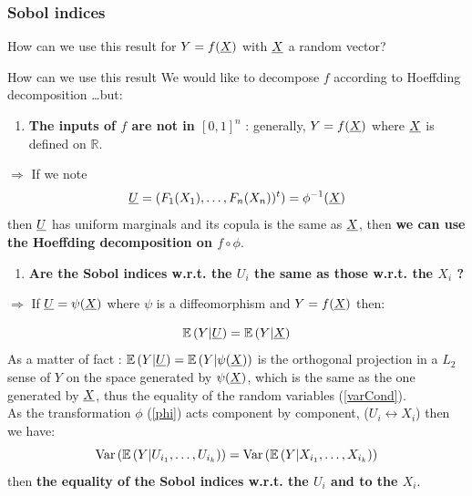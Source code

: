 \documentclass[8pt]{beamer}
\begin{document}
\begin{frame}
\frametitle{Sobol indices}
\small
How can we use this result for $Y = f({\underline{X}})$ with ${\underline{X}}$ a random vector?

\begin{block}{How can we use this result}
    \small
      We would like to decompose $f$ according to Hoeffding decomposition \dots but: \\
      \begin{enumerate}
      \item  \alert{\bf The inputs of $f$ are not in $[0,1]^n$} :  generally, $Y=f({\underline{X}})$ where  ${\underline{X}}$ is defined on $\mathbb{R}$.
      \end{enumerate}
      \alert{$\Longrightarrow$} If we note
       \begin{equation}
         \label{phi}
         {\underline{U}} = (F_1(X_1), \dots, F_n(X_n))^t) = \phi^{-1}({\underline{X}})
       \end{equation}
       then ${\underline{U}}$ has uniform marginals and its copula is the same as ${\underline{X}}$, then {\bf we can use the Hoeffding decomposition on $f \circ \phi$}.

       \begin{enumerate}
       \item  \alert{\bf Are the Sobol indices w.r.t. the  $U_i$ the same as those w.r.t. the $X_i$ ?}
       \end{enumerate}
       \alert{$\Longrightarrow$} If ${\underline{U}} = \psi({\underline{X}})$ where $\psi$ is a diffeomorphism and $Y=f({\underline{X}})$ then:

       \begin{equation}
         \label{varCond}
         \mathbb{E}\left( Y|{\underline{U}} \right) = \mathbb{E}\left( Y|{\underline{X}} \right)
       \end{equation}
       As a matter of fact : $\mathbb{E}\left( Y|{\underline{U}} \right) = \mathbb{E}\left( Y|\psi({\underline{X}}) \right)$ is the orthogonal projection in a $L_2$ sense of $Y$ on the space generated by $\psi({\underline{X}})$, which is the same as the one generated by ${\underline{X}}$, thus the equality of the random variables  (\ref{varCond}).\\
       As the transformation $\phi$ (\ref{phi}) acts component by component, ($U_i \leftrightarrow X_i$) then we have:
       \begin{equation}
         \label{varCond2}
         \mbox{Var}\left( \mathbb{E}\left( Y|U_{i_1}, \dots, U_{i_k} \right) \right) = \mbox{Var}\left( \mathbb{E}\left( Y|X_{i_1}, \dots, X_{i_k} \right) \right)
       \end{equation}
       then {\bf the equality of the Sobol indices w.r.t. the  $U_i$ and to the  $X_i$}.
  \end{block}

\end{frame}
\end{document}
